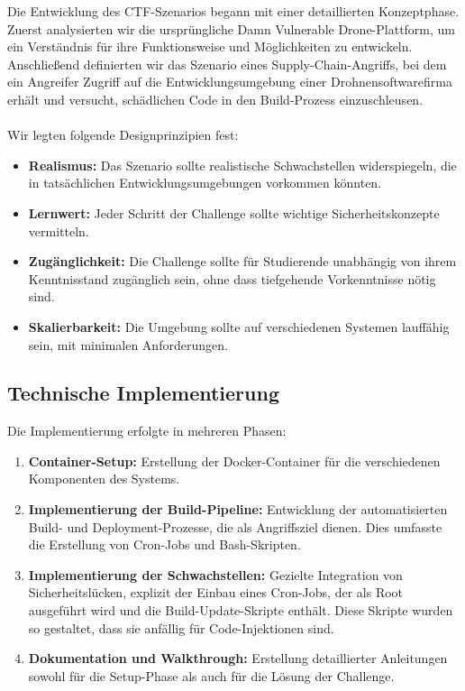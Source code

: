 \documentclass[12pt]{scrartcl}
\begin{document}
    Die Entwicklung des CTF-Szenarios begann mit einer detaillierten Konzeptphase. Zuerst analysierten wir die ursprüngliche Damn Vulnerable Drone-Plattform, um ein Verständnis für ihre Funktionsweise und Möglichkeiten zu entwickeln. Anschließend definierten wir das Szenario eines Supply-Chain-Angriffs, bei dem ein Angreifer Zugriff auf die Entwicklungsumgebung einer Drohnensoftwarefirma erhält und versucht, schädlichen Code in den Build-Prozess einzuschleusen. \\
    \\
    \noindent
    Wir legten folgende Designprinzipien fest:
    
    \begin{itemize}
        \item \textbf{Realismus:} Das Szenario sollte realistische Schwachstellen widerspiegeln, die in tatsächlichen Entwicklungsumgebungen vorkommen könnten.
        
        \item \textbf{Lernwert:} Jeder Schritt der Challenge sollte wichtige Sicherheitskonzepte vermitteln.
        
        \item \textbf{Zugänglichkeit:} Die Challenge sollte für Studierende unabhängig von ihrem Kenntnisstand zugänglich sein, ohne dass tiefgehende Vorkenntnisse nötig sind.

        \item \textbf{Skalierbarkeit:} Die Umgebung sollte auf verschiedenen Systemen lauffähig sein, mit minimalen Anforderungen.
    \end{itemize}
    
    \newpage

    \subsection{Technische Implementierung}
    
    Die Implementierung erfolgte in mehreren Phasen:
    
    \begin{enumerate}
        \item \textbf{Container-Setup:} Erstellung der Docker-Container für die verschiedenen Komponenten des Systems.
                
        \item \textbf{Implementierung der Build-Pipeline:} Entwicklung der automatisierten Build- und Deployment-Prozesse, die als Angriffsziel dienen. Dies umfasste die Erstellung von Cron-Jobs und Bash-Skripten.
        
        \item \textbf{Implementierung der Schwachstellen:} Gezielte Integration von Sicherheitslücken, explizit der Einbau eines Cron-Jobs, der als Root ausgeführt wird und die Build-Update-Skripte enthält. Diese Skripte wurden so gestaltet, dass sie anfällig für Code-Injektionen sind.
               
        \item \textbf{Dokumentation und Walkthrough:} Erstellung detaillierter Anleitungen sowohl für die Setup-Phase als auch für die Lösung der Challenge.
    \end{enumerate}
    
\end{document}
